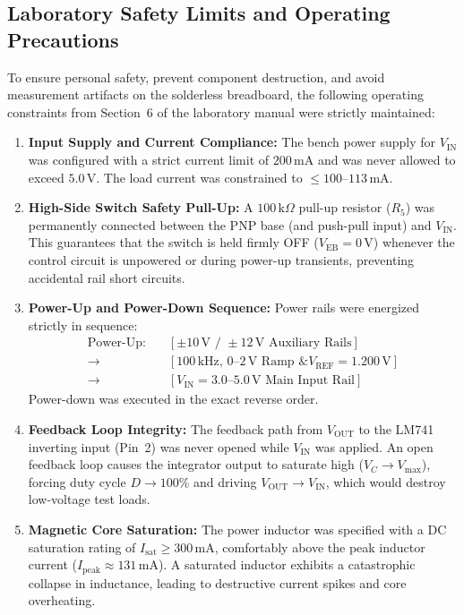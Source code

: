 \documentclass[11pt,a4paper]{article}
\begin{document}
\subsection{Laboratory Safety Limits and Operating Precautions}
To ensure personal safety, prevent component destruction, and avoid measurement artifacts on the solderless breadboard, the following operating constraints from Section~6 of the laboratory manual were strictly maintained:
\begin{enumerate}
    \item \textbf{Input Supply and Current Compliance:} The bench power supply for $V_{\mathrm{IN}}$ was configured with a strict current limit of $200\,\mathrm{mA}$ and was never allowed to exceed $5.0\,\mathrm{V}$. The load current was constrained to $\le 100\text{--}113\,\mathrm{mA}$.
    \item \textbf{High-Side Switch Safety Pull-Up:} A $100\,\mathrm{k}\Omega$ pull-up resistor ($R_5$) was permanently connected between the PNP base (and push-pull input) and $V_{\mathrm{IN}}$. This guarantees that the switch is held firmly OFF ($V_{\mathrm{EB}} = 0\,\mathrm{V}$) whenever the control circuit is unpowered or during power-up transients, preventing accidental rail short circuits.
    \item \textbf{Power-Up and Power-Down Sequence:} Power rails were energized strictly in sequence:
    \begin{align*}
        \text{Power-Up:} \quad &[\pm 10\,\mathrm{V} \text{ / } \pm 12\,\mathrm{V} \text{ Auxiliary Rails}] \\
        \longrightarrow \;&[100\,\mathrm{kHz},\,0\text{--}2\,\mathrm{V} \text{ Ramp \& } V_{\mathrm{REF}} = 1.200\,\mathrm{V}] \\
        \longrightarrow \;&[V_{\mathrm{IN}} = 3.0\text{--}5.0\,\mathrm{V} \text{ Main Input Rail}]
    \end{align*}
    Power-down was executed in the exact reverse order.
    \item \textbf{Feedback Loop Integrity:} The feedback path from $V_{\mathrm{OUT}}$ to the LM741 inverting input (Pin~2) was never opened while $V_{\mathrm{IN}}$ was applied. An open feedback loop causes the integrator output to saturate high ($V_C \to V_{\mathrm{max}}$), forcing duty cycle $D \to 100\%$ and driving $V_{\mathrm{OUT}} \to V_{\mathrm{IN}}$, which would destroy low-voltage test loads.
    \item \textbf{Magnetic Core Saturation:} The power inductor was specified with a DC saturation rating of $I_{\mathrm{sat}} \ge 300\,\mathrm{mA}$, comfortably above the peak inductor current ($I_{\mathrm{peak}} \approx 131\,\mathrm{mA}$). A saturated inductor exhibits a catastrophic collapse in inductance, leading to destructive current spikes and core overheating.

\end{enumerate}
\end{document}
